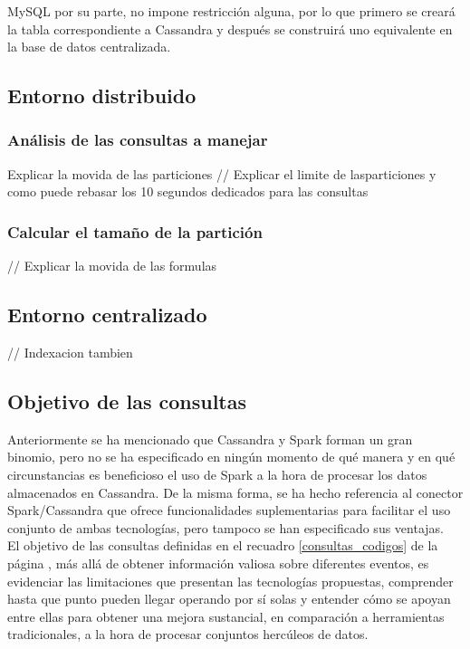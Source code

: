 MySQL por su parte, no impone restricción alguna, por lo que primero se creará la tabla correspondiente a Cassandra y después se construirá uno equivalente en la base de datos centralizada.

\subsection{Entorno distribuido}

\subsubsection{Análisis de las consultas a manejar}

Explicar la movida de las particiones
// Explicar el limite de lasparticiones y como puede rebasar los 10 segundos dedicados para las consultas

\subsubsection{Calcular el tamaño de la partición}

// Explicar la movida de las formulas


\subsection{Entorno centralizado}

// Indexacion tambien

\subsection{Objetivo de las consultas}
\label{objetivo_consultas}

Anteriormente se ha mencionado que Cassandra y Spark forman un gran binomio, pero no se ha especificado en ningún momento de qué manera y en qué circunstancias es beneficioso el uso de Spark a la hora de procesar los datos almacenados en Cassandra. De la misma forma, se ha hecho referencia al conector Spark/Cassandra que ofrece funcionalidades suplementarias para facilitar el uso conjunto de ambas tecnologías, pero tampoco se han especificado sus ventajas.\\

El objetivo de las consultas definidas en el recuadro \ref{consultas_codigos} de la página \pageref{consultas_codigos}, más allá de obtener información valiosa sobre diferentes eventos, es evidenciar las limitaciones que presentan las tecnologías propuestas, comprender hasta que punto pueden llegar operando por sí solas y entender cómo se apoyan entre ellas para obtener una mejora sustancial, en comparación a herramientas tradicionales, a la hora de procesar conjuntos hercúleos de datos.\\

